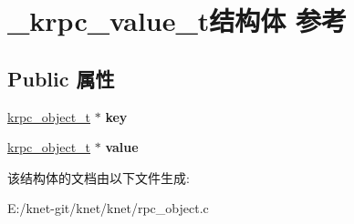 \hypertarget{struct__krpc__value__t}{}\section{\+\_\+krpc\+\_\+value\+\_\+t结构体 参考}
\label{struct__krpc__value__t}
\subsection*{Public 属性}
\begin{DoxyCompactItemize}
\item 
\hypertarget{struct__krpc__value__t_ae581fda853477cddeeba924358aef44e}{}\hyperlink{struct__krpc__object__t}{krpc\+\_\+object\+\_\+t} $\ast$ {\bfseries key}\label{struct__krpc__value__t_ae581fda853477cddeeba924358aef44e}

\item 
\hypertarget{struct__krpc__value__t_a9944413a85a2590641cdc91b3d298ee8}{}\hyperlink{struct__krpc__object__t}{krpc\+\_\+object\+\_\+t} $\ast$ {\bfseries value}\label{struct__krpc__value__t_a9944413a85a2590641cdc91b3d298ee8}

\end{DoxyCompactItemize}


该结构体的文档由以下文件生成\+:\begin{DoxyCompactItemize}
\item 
E\+:/knet-\/git/knet/knet/rpc\+\_\+object.\+c\end{DoxyCompactItemize}
